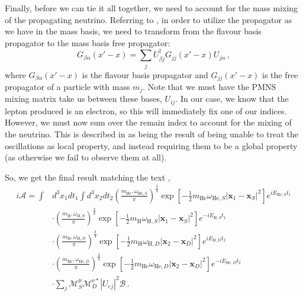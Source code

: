\documentclass[10pt]{article}
\begin{document}
Finally, before we can tie it all together, we need to account for the mass mixing of the propagating neutrino. Referring to \cite{Beuthe_2003}, in order to utilize the propagator as we have in the mass basis, we need to transform from the flavour basis propagator to the mass basis free propagator:
\begin{equation}
  G_{\beta\alpha}(x' - x) = \sum_{j}U_{\beta j}^{\dagger}G_{jj}(x' - x)U_{j\alpha}\,,
\end{equation}
where $G_{\beta\alpha}(x' - x)$ is the flavour basis propagator and $G_{jj}(x' - x)$ is the free propagator of a particle with mass $m_{j}$. Note that we must have the PMNS mixing matrix take us between these bases, $U_{ij}$. In our case, we know that the lepton produced is an electron, so this will immediately fix one of our indices. However, we must now sum over the remain index to account for the mixing of the neutrino. This is described in \cite{Beuthe_2003} as being the result of being unable to treat the oscillations as local property, and instead requiring them to be a global property (as otherwise we fail to observe them at all).

So, we get the final result matching the text \cite{Akhmedov_2008},
\begin{equation}\label{eq:final}
  \begin{split}
  i\mathcal{A} = \int & d^{3}x_{1}dt_{1}\int d^{3}x_{2}dt_{2} \left(\frac{m_{\text{He}},\omega_{\text{He},S}}{\pi}\right)^{\frac{3}{4}}\exp\left[-\frac{1}{2}m_{\text{He}}\omega_{\text{He},S}|\bm{x}_{1} - \bm{x}_{S}|^{2}\right]e^{iE_{\text{He},S}t_{1}}\\
  & \cdot \left(\frac{m_{\text{H}},\omega_{\text{H},S}}{\pi}\right)^{\frac{3}{4}}\exp\left[-\frac{1}{2}m_{\text{H}}\omega_{\text{H},S}|\bm{x}_{1} - \bm{x}_{S}|^{2}\right]e^{-iE_{\text{H},S}t_{1}} \\
  & \cdot \left(\frac{m_{\text{H}},\omega_{\text{H},D}}{\pi}\right)^{\frac{3}{4}}\exp\left[-\frac{1}{2}m_{\text{H}}\omega_{\text{H},D}|\bm{x}_{2} - \bm{x}_{D}|^{2}\right]e^{iE_{\text{H},D}t_{2}}\\
  & \cdot \left(\frac{m_{\text{He}},\omega_{\text{He},D}}{\pi}\right)^{\frac{3}{4}}\exp\left[-\frac{1}{2}m_{\text{He}}\omega_{\text{He},D}|\bm{x}_{2} - \bm{x}_{D}|^{2}\right]e^{-iE_{\text{He},D}t_{2}}\\
  & \cdot\sum_{j}\mathcal{M}^{\mu}_{S}\mathcal{M}^{\nu *}_{D}|U_{ej}|^{2}\mathcal{B} \, .
  \end{split}
\end{equation}
\end{document}
